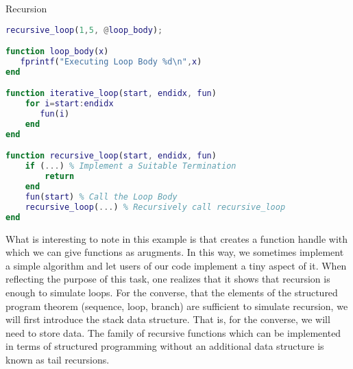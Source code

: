 \begin{task}{Recursion}{}{}
\begin{enumerate}
{\begin{lstlisting}[language=matlab]
recursive_loop(1,5, @loop_body);

function loop_body(x)
   fprintf("Executing Loop Body %d\n",x)
end

function iterative_loop(start, endidx, fun)
    for i=start:endidx
       fun(i)
    end
end

function recursive_loop(start, endidx, fun)
    if (...) % Implement a Suitable Termination
        return
    end
    fun(start) % Call the Loop Body
    recursive_loop(...) % Recursively call recursive_loop
end
\end{lstlisting}
What is interesting to note in this example is that  creates a function handle with which we can give functions as arugments. In this way, we sometimes implement a simple algorithm and let users of our code implement a tiny aspect of it.
When reflecting the purpose of this task, one realizes that it shows that recursion is enough to simulate loops. For the converse, that the elements of the structured program theorem (sequence, loop, branch) are sufficient to simulate recursion, we will first introduce the stack data structure. That is, for the converse, we will need to store data. The family of recursive functions which can be implemented in terms of structured programming without an additional data structure is known as tail recursions.
}




  \end{enumerate}

  

\end{task}
